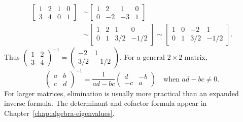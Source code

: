\begin{example}
\begin{align*}
\left[\begin{array}{cc|cc}1&2&1&0\\3&4&0&1\end{array}\right]
&\sim\left[\begin{array}{cc|cc}1&2&1&0\\0&-2&-3&1\end{array}\right]\\
&\sim\left[\begin{array}{cc|cc}1&2&1&0\\0&1&3/2&-1/2\end{array}\right]
\sim\left[\begin{array}{cc|cc}1&0&-2&1\\0&1&3/2&-1/2\end{array}\right].
\end{align*}
Thus $\begin{pmatrix}1&2\\3&4\end{pmatrix}^{-1}
=\begin{pmatrix}-2&1\\3/2&-1/2\end{pmatrix}$.
For a general $2\times2$ matrix,
\[
\begin{pmatrix}a&b\\c&d\end{pmatrix}^{-1}
=\frac1{ad-bc}\begin{pmatrix}d&-b\\-c&a\end{pmatrix}
\quad\text{when }ad-bc\ne0.
\]
For larger matrices, elimination is usually more practical than an expanded
inverse formula. The determinant and cofactor formula appear in
Chapter~\ref{chap:algebra-eigenvalues}.
\end{example}
